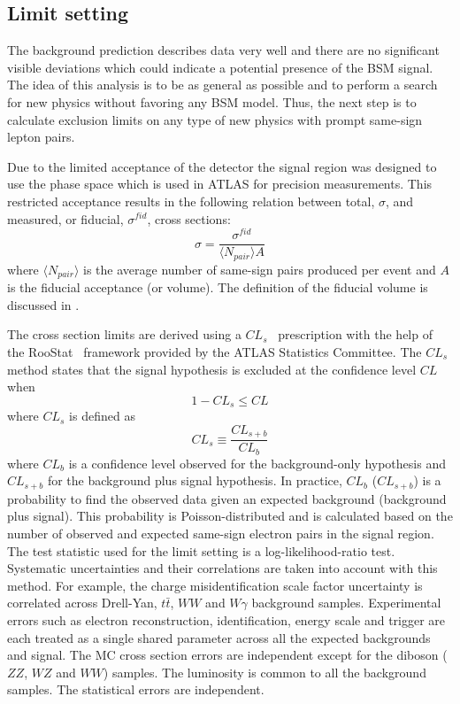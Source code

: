 \subsection{Limit setting}

The background prediction describes data very well and there are no significant visible deviations which could indicate a potential presence of the BSM signal.
The idea of this analysis is to be as general as possible and to perform a search for new physics without favoring any BSM model.
Thus, the next step is to calculate exclusion limits on any type of new physics with prompt same-sign lepton pairs.

Due to the limited acceptance of the detector the signal region was designed to use the phase space which is used in ATLAS for precision measurements.
This restricted acceptance results in the following relation between total, $\sigma$, and measured, or fiducial, $\sigma^{fid}$, cross sections:
\begin{equation}
 \sigma = \dfrac{\sigma^{fid}}{\langle N_{pair} \rangle A}
 \label{eq:cross_section}
\end{equation}
where $\langle N_{pair} \rangle$ is the average number of same-sign pairs produced per event and $A$ is the fiducial acceptance (or volume).
The definition of the fiducial volume is discussed in .

The cross section limits are derived using a $CL_s$~\cite{CLs_tecnique,CLs_2} prescription with the help of the RooStat~\cite{RooStat_project} framework 
provided by the ATLAS Statistics Committee. The $CL_s$ method states that the signal hypothesis is excluded at the confidence level $CL$ when
\begin{equation}
 1 - CL_s \leq CL
\end{equation}
where $CL_s$ is defined as
\begin{equation}
 CL_s \equiv \dfrac{CL_{s+b}}{CL_b}
\end{equation}
where $CL_b$ is a confidence level observed for the background-only hypothesis and $CL_{s+b}$ for the background plus signal hypothesis.
In practice, $CL_b$ ($CL_{s+b}$) is a probability to find the observed data given an expected background (background plus signal).
This probability is Poisson-distributed and is calculated based on the number of observed and expected same-sign electron pairs in the signal region.
The test statistic used for the limit setting is a log-likelihood-ratio test.
Systematic uncertainties and their correlations are taken into account with this method.
For example, the charge misidentification scale factor uncertainty is correlated across Drell-Yan, $t\bar{t}$, $WW$ and $W\gamma$ background samples.
Experimental errors such as electron reconstruction, identification, energy scale and trigger are each treated as a single shared parameter across all the expected backgrounds and signal.
The MC cross section errors are independent except for the diboson ($ZZ$, $WZ$ and $WW$) samples.
The luminosity is common to all the background samples. The statistical errors are independent.


